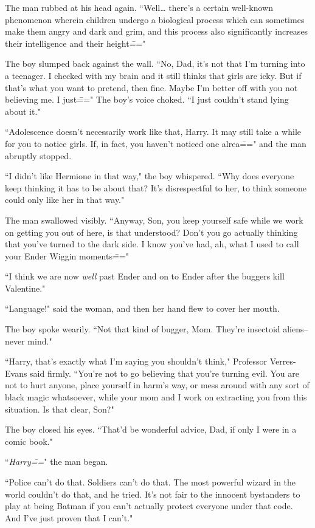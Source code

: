 The man rubbed at his head again. ``Well{\ldots} there's a certain well-known phenomenon wherein children undergo a biological process which can sometimes make them angry and dark and grim, and this process also significantly increases their intelligence and their height\==="

The boy slumped back against the wall. ``No, Dad, it's not that I'm turning into a teenager. I checked with my brain and it still thinks that girls are icky. But if that's what you want to pretend, then fine. Maybe I'm better off with you not believing me. I just\===" The boy's voice choked. ``I just couldn't stand lying about it."

``Adolescence doesn't necessarily work like that, Harry. It may still take a while for you to notice girls. If, in fact, you haven't noticed one alrea\===" and the man abruptly stopped.

``I didn't like Hermione in that way," the boy whispered. ``Why does everyone keep thinking it has to be about that? It's disrespectful to her, to think someone could only like her in that way."

The man swallowed visibly. ``Anyway, Son, you keep yourself safe while we work on getting you out of here, is that understood? Don't you go actually thinking that you've turned to the dark side. I know you've had, ah, what I used to call your Ender Wiggin moments\==="

``I think we are now \emph{well} past Ender and on to Ender after the buggers kill Valentine."

``Language!" said the woman, and then her hand flew to cover her mouth.

The boy spoke wearily. ``Not that kind of bugger, Mom. They're insectoid aliens\---never mind."

``Harry, that's exactly what I'm saying you shouldn't think," Professor Verres-Evans said firmly. ``You're not to go believing that you're turning evil. You are not to hurt anyone, place yourself in harm's way, or mess around with any sort of black magic whatsoever, while your mom and I work on extracting you from this situation. Is that clear, Son?"

The boy closed his eyes. ``That'd be wonderful advice, Dad, if only I were in a comic book."

``\emph{Harry\===}" the man began.

``Police can't do that. Soldiers can't do that. The most powerful wizard in the world couldn't do that, and he tried. It's not fair to the innocent bystanders to play at being Batman if you can't actually protect everyone under that code. And I've just proven that I can't."

